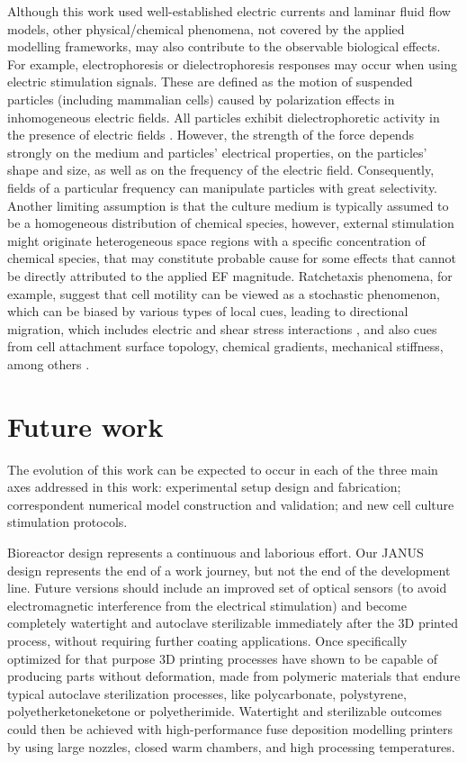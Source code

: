 Although this work used well-established electric currents and laminar fluid flow models, other physical/chemical phenomena, not covered by the applied modelling frameworks, may also contribute to the observable biological effects. For example, electrophoresis or dielectrophoresis responses may occur when using electric stimulation signals. These are defined as the motion of suspended particles (including mammalian cells) caused by polarization effects in inhomogeneous electric fields. All particles exhibit dielectrophoretic activity in the presence of electric fields \cite{Park2020-lj, Pethig_undated-bv}. However, the strength of the force depends strongly on the medium and particles' electrical properties, on the particles' shape and size, as well as on the frequency of the electric field. Consequently, fields of a particular frequency can manipulate particles with great selectivity. Another limiting assumption is that
the culture medium is typically assumed to be a homogeneous distribution of chemical species, however, external stimulation might originate heterogeneous space regions with a specific concentration of chemical species, that may constitute probable cause for some effects that cannot be directly attributed to the applied \acs{EF} magnitude. Ratchetaxis phenomena, for example, suggest that cell motility can be viewed as a stochastic phenomenon, which can be biased by various types of local cues, leading to directional migration, which includes electric and shear stress interactions \cite{Zhao2011-wy}, and also cues from cell attachment surface topology, chemical gradients, mechanical stiffness, among others \cite{Caballero2015-cs, Pieuchot2018-kl}. 




\section{Future work}
The evolution of this work can be expected to occur in each of the three main axes addressed in this work: experimental setup design and fabrication; correspondent numerical model construction and validation; and new cell culture stimulation protocols. 

Bioreactor design represents a continuous and laborious effort. Our JANUS design represents the end of a work journey, but not the end of the development line. Future versions should include an improved set of optical sensors (to avoid electromagnetic interference from the electrical stimulation) and become completely watertight and autoclave sterilizable immediately after the \acs{3D} printed process, without requiring further coating applications. Once specifically optimized for that purpose \acs{3D} printing processes have shown to be capable of producing parts without deformation, made from polymeric materials that endure typical autoclave sterilization processes, like polycarbonate, polystyrene, polyetherketoneketone or polyetherimide. Watertight and sterilizable outcomes could then be achieved with high-performance fuse deposition modelling printers by using large nozzles, closed warm chambers, and high processing temperatures. 

